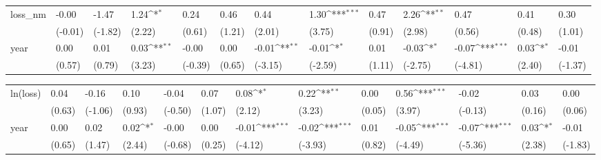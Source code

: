 \def\sym#1{\ifmmode^{#1}\else\(^{#1}\)\fi}
\begin{tabular}{p{1.5cm} p{1.7cm} p{1.7cm} p{1.7cm}  p{1.7cm} p{1.7cm} p{1.7cm} p{1.7cm} p{1.7cm}  p{1.7cm} p{1.7cm} p{1.7cm} p{1.7cm} }
\hline
loss\_nm         &    -0.00         &    -1.47         &     1.24\sym{*}  &     0.24         &     0.46         &     0.44         &     1.30\sym{***}&     0.47         &     2.26\sym{**} &     0.47         &     0.41         &     0.30         \\
                &  (-0.01)         &  (-1.82)         &   (2.22)         &   (0.61)         &   (1.21)         &   (2.01)         &   (3.75)         &   (0.91)         &   (2.98)         &   (0.56)         &   (0.48)         &   (1.01)         \\
year            &     0.00         &     0.01         &     0.03\sym{**} &    -0.00         &     0.00         &    -0.01\sym{**} &    -0.01\sym{*}  &     0.01         &    -0.03\sym{*}  &    -0.07\sym{***}&     0.03\sym{*}  &    -0.01         \\
                &   (0.57)         &   (0.79)         &   (3.23)         &  (-0.39)         &   (0.65)         &  (-3.15)         &  (-2.59)         &   (1.11)         &  (-2.75)         &  (-4.81)         &   (2.40)         &  (-1.37)         \\
\end{tabular}
\def\sym#1{\ifmmode^{#1}\else\(^{#1}\)\fi}
\begin{tabular}{p{1.5cm} p{1.7cm} p{1.7cm} p{1.7cm}  p{1.7cm} p{1.7cm} p{1.7cm} p{1.7cm} p{1.7cm}  p{1.7cm} p{1.7cm} p{1.7cm} p{1.7cm} }
\hline
ln(loss)        &     0.04         &    -0.16         &     0.10         &    -0.04         &     0.07         &     0.08\sym{*}  &     0.22\sym{**} &     0.00         &     0.56\sym{***}&    -0.02         &     0.03         &     0.00         \\
                &   (0.63)         &  (-1.06)         &   (0.93)         &  (-0.50)         &   (1.07)         &   (2.12)         &   (3.23)         &   (0.05)         &   (3.97)         &  (-0.13)         &   (0.16)         &   (0.06)         \\
year            &     0.00         &     0.02         &     0.02\sym{*}  &    -0.00         &     0.00         &    -0.01\sym{***}&    -0.02\sym{***}&     0.01         &    -0.05\sym{***}&    -0.07\sym{***}&     0.03\sym{*}  &    -0.01         \\
                &   (0.65)         &   (1.47)         &   (2.44)         &  (-0.68)         &   (0.25)         &  (-4.12)         &  (-3.93)         &   (0.82)         &  (-4.49)         &  (-5.36)         &   (2.38)         &  (-1.83)         \\
\end{tabular}
